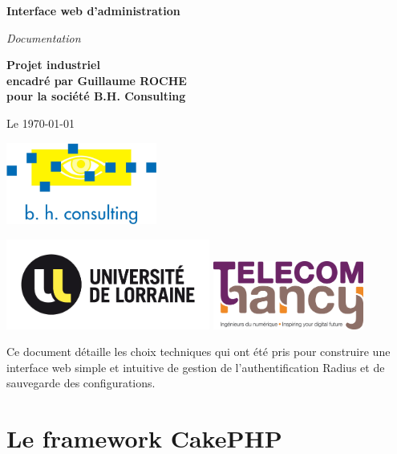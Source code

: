 \documentclass[10pt]{article}
\begin{document}
\begin{center}
	{\Huge\textbf{Interface web d'administration}}

	\vspace{1cm}

	{\huge\emph{Documentation}}

	\vspace{1cm}

	{\large\textbf{Projet industriel\\ encadré par Guillaume ROCHE\\ pour la société B.H. Consulting}}

	\vspace{1cm}
	{\large Le \today}

	\vspace{1.5cm}

	\includegraphics[width=140pt]{templates/img/BHConsulting.jpg}

	\vspace{1.5cm}

	\includegraphics[width=190pt]{templates/img/ul.png}
	\hspace{3.5cm}
	\includegraphics[width=140pt]{templates/img/telecom-nancy.jpg}
\end{center}
\newpage

\thispagestyle{empty}
\tableofcontents
\newpage

Ce document détaille les choix techniques qui ont été pris pour construire une interface web simple et intuitive de gestion de l'authentification Radius et de sauvegarde des configurations.

\section{Le framework CakePHP}
\end{document}
